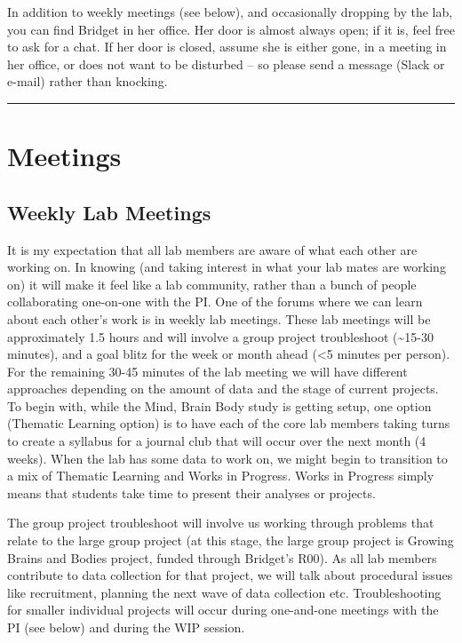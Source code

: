\documentclass[]{book}
\begin{document}
In addition to weekly meetings (see below), and occasionally dropping by the lab, you can find Bridget in her office. Her door is almost always open; if it is, feel free to ask for a chat. If her door is closed, assume she is either gone, in a meeting in her office, or does not want to be disturbed -- so please send a message (Slack or e-mail) rather than knocking.

\begin{center}\rule{0.5\linewidth}{\linethickness}\end{center}

\hypertarget{meetings}{%
\section{Meetings}\label{meetings}}

\hypertarget{weekly-lab-meetings}{%
\subsection{Weekly Lab Meetings}\label{weekly-lab-meetings}}

It is my expectation that all lab members are aware of what each other are working on. In knowing (and taking interest in what your lab mates are working on) it will make it feel like a lab community, rather than a bunch of people collaborating one-on-one with the PI. One of the forums where we can learn about each other's work is in weekly lab meetings. These lab meetings will be approximately 1.5 hours and will involve a group project troubleshoot (\textasciitilde{}15-30 minutes), and a goal blitz for the week or month ahead (\textless{}5 minutes per person). For the remaining 30-45 minutes of the lab meeting we will have different approaches depending on the amount of data and the stage of current projects. To begin with, while the Mind, Brain Body study is getting setup, one option (Thematic Learning option) is to have each of the core lab members taking turns to create a syllabus for a journal club that will occur over the next month (4 weeks). When the lab has some data to work on, we might begin to transition to a mix of Thematic Learning and Works in Progress. Works in Progress simply means that students take time to present their analyses or projects.

The group project troubleshoot will involve us working through problems that relate to the large group project (at this stage, the large group project is Growing Brains and Bodies project, funded through Bridget's R00). As all lab members contribute to data collection for that project, we will talk about procedural issues like recruitment, planning the next wave of data collection etc. Troubleshooting for smaller individual projects will occur during one-and-one meetings with the PI (see below) and during the WIP session.
\end{document}
